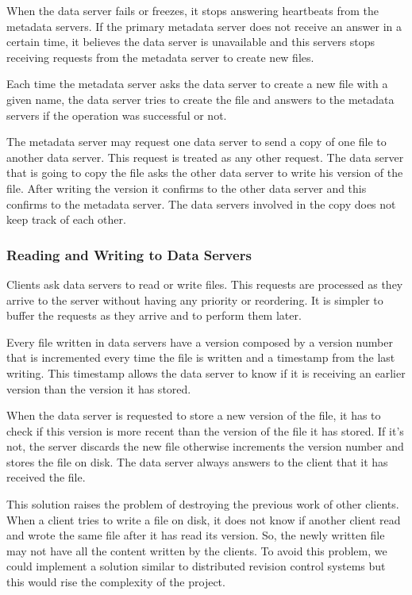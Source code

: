 When the data server fails or freezes, it stops answering heartbeats from
the metadata servers. If the primary metadata server does not receive an
answer in a certain time, it believes the data server is unavailable
and this servers stops receiving requests from the metadata server to
create new files.

Each time the metadata server asks the data server to create a new file
with a given name, the data server tries to create the file and answers
to the metadata servers if the operation was successful or not.

The metadata server may request one data server to send a copy of one file
to another data server. This request is treated as any other request.
The data server that is going to copy the file asks the other data server
to write his version of the file. After writing the version it confirms to
the other data server and this confirms to the metadata server.
The data servers involved in the copy does not keep track of each other.

\subsubsection{Reading and Writing to Data Servers}

Clients ask data servers to read or write files. This requests are
processed as they arrive to the server without having any priority or 
reordering. It is simpler to buffer the requests as they arrive and to
perform them later.

Every file written in data servers have a version composed by a version
number that is incremented every time the file is written and a timestamp
from the last writing. This timestamp allows the data server to know if it is
receiving an earlier version than the version it has stored.

When the data server is requested to store a new version of the file, it has 
to check if this version is more recent than the version of the file it has 
stored. If it's not, the server discards the new file otherwise increments 
the version number and stores the file on disk. The data server always answers
to the client that it has received the file.

This solution raises the problem of destroying the previous work of other 
clients. When a client tries to write a file on disk, it does not know if 
another client read and wrote the same file after it has read its version. 
So, the newly written file may not have all the content written by the 
clients. To avoid this problem, we could implement a solution similar to 
distributed revision control systems but this would rise the complexity 
of the project.
